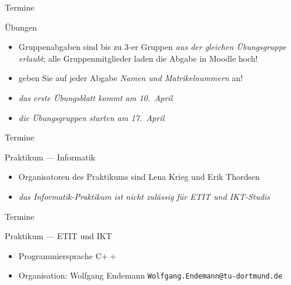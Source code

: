 \documentclass[aspectratio=1610, 11pt]{beamer}
\begin{document}
\begin{frame}{Termine}
	\begin{exampleblock}{\"Ubungen}
		\begin{itemize}
			\item Gruppenabgaben sind bis zu 3-er Gruppen \emph{aus der gleichen \"Ubungsgruppe erlaubt}; alle Gruppenmitglieder laden die Abgabe in Moodle hoch!
			\item geben Sie auf jeder Abgabe \emph{Namen und Matrikelnummern} an!
			\item \emph{das erste \"Ubungsblatt kommt am 10.~April}
			\item \emph{die \"Ubungsgruppen starten am 17.~April}
		\end{itemize}
	\end{exampleblock}
\end{frame}

\begin{frame}{Termine}
	\begin{exampleblock}{Praktikum --- Informatik}
		\begin{itemize}
			\item Organisatoren des Praktikums sind Lena Krieg und Erik Thordsen
			\item \emph{das Informatik-Praktikum ist nicht zul\"assig f\"ur ETIT und IKT-Studis}
		\end{itemize}
	\end{exampleblock}
\end{frame}

\begin{frame}{Termine}
	\begin{exampleblock}{Praktikum --- ETIT und IKT}
		\begin{itemize}
			\item Programmiersprache C$++$
			\item Organisation: Wolfgang Endemann \hfill {\tt Wolfgang.Endemann@tu-dortmund.de}
		\end{itemize}
	\end{exampleblock}
\end{frame}
\end{document}
